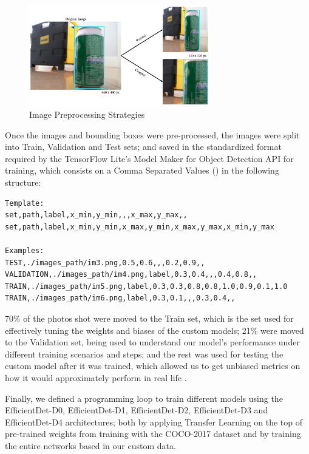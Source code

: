 \documentclass[openright]{normas-utf-tex} %
\begin{document}
\begin{figure}[H]
	\centering
	\includegraphics[width=0.7\textwidth]{./images/image_preprocessing.png}
	\caption[Image Preprocessing Strategies]{Image Preprocessing Strategies}
\end{figure}

Once the images and bounding boxes were pre-processed, the images were split into Train, Validation 
and Test sets; and saved in the standardized format required by the TensorFlow Lite's Model Maker for Object Detection API for training,
which consists on a Comma Separated Values () in the following
structure:

\begin{lstlisting}[caption={CSV format for specifying the Train, Test and Validation 
	image sets for training models using the TensorFlow's Model Maker API for Object 
	Detection},label={lst:csvFormatTrain}]
Template:
set,path,label,x_min,y_min,,,x_max,y_max,,
set,path,label,x_min,y_min,x_max,y_min,x_max,y_max,x_min,y_max

Examples:
TEST,./images_path/im3.png,0.5,0.6,,,0.2,0.9,,
VALIDATION,./images_path/im4.png,label,0.3,0.4,,,0.4,0.8,,
TRAIN,./images_path/im5.png,label,0.3,0.3,0.8,0.8,1.0,0.9,0.1,1.0
TRAIN,./images_path/im6.png,label,0.3,0.1,,,0.3,0.4,,
\end{lstlisting}

70\% of the photos shot were moved to the Train set, which is the set used for effectively 
tuning the weights and biases of the custom models; 21\% were moved to the Validation set, 
being used to understand our model's performance under different training scenarios and steps; 
and the rest was used for testing the custom model after it was trained, which allowed us to 
get unbiased metrics on how it would approximately perform in real life \cite{MluExplain}.

Finally, we defined a programming loop to train different models using the EfficientDet-D0,
EfficientDet-D1, EfficientDet-D2, EfficientDet-D3 and EfficientDet-D4 architectures; both by
applying Transfer Learning on the top of pre-trained weights from training with the COCO-2017 dataset 
and by training the entire networks based in our custom data. 
\end{document}
